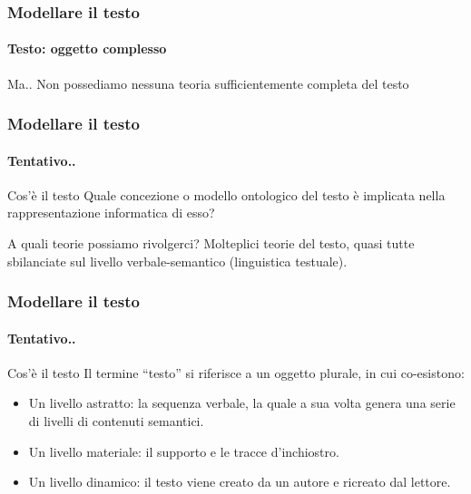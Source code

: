 \begin{frame}
	\frametitle{Modellare il testo}
	\framesubtitle{Testo: oggetto complesso}
	\addtocounter{nframe}{1}

	\begin{block}{Ma..}
		Non possediamo nessuna teoria sufficientemente completa del testo
	\end{block}

\end{frame}

\begin{frame}
	\frametitle{Modellare il testo}
	\framesubtitle{Tentativo..}
	\addtocounter{nframe}{1}

	\begin{block}{Cos'è il testo}
		Quale concezione o modello ontologico del testo è implicata nella rappresentazione informatica di esso?
	\end{block}

	\begin{block}{A quali teorie possiamo rivolgerci?}
		Molteplici teorie del testo, quasi tutte sbilanciate sul livello verbale-semantico (linguistica testuale).
	\end{block}

\end{frame}

\begin{frame}
	\frametitle{Modellare il testo}
	\framesubtitle{Tentativo..}
	\addtocounter{nframe}{1}

	\begin{block}{Cos'è il testo}
		Il termine ``testo''  si riferisce a un oggetto plurale, in cui co-esistono:
		\begin{itemize}
			\item Un livello astratto: la sequenza verbale, la quale a sua volta genera una serie di livelli di contenuti semantici.
			\item Un livello materiale: il supporto e le tracce d’inchiostro.
			\item Un livello dinamico: il testo viene creato da un autore e ricreato dal lettore.
		\end{itemize}

	\end{block}

\end{frame}


